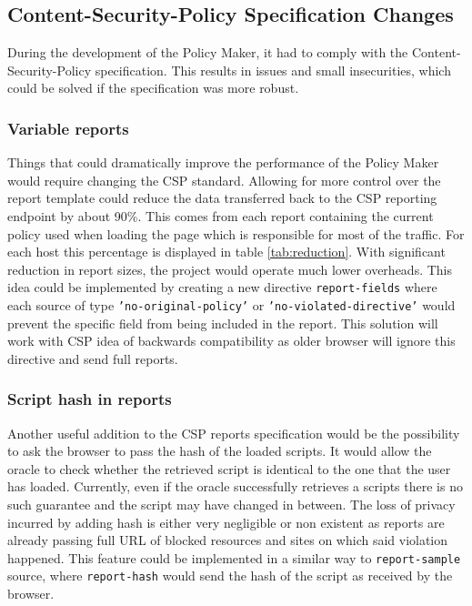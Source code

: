 \subsection{Content-Security-Policy Specification Changes}

During the development of the Policy Maker, it had to comply with the Content-Security-Policy specification.
This results in issues and small insecurities, which could be solved if the specification was more robust.

\subsubsection{Variable reports}

Things that could dramatically improve the performance of the Policy Maker would require changing the CSP standard.
Allowing for more control over the report template could reduce the data transferred back to the CSP reporting endpoint by about 90\%.
This comes from each report containing the current policy used when loading the page which is responsible for most of the traffic.
For each host this percentage is displayed in table \ref{tab:reduction}.
With significant reduction in report sizes, the project would operate much lower overheads.
This idea could be implemented by creating a new directive \texttt{report-fields} where each source of type \texttt{'no-original-policy'} or \texttt{'no-violated-directive'} would prevent the specific field from being included in the report.
This solution will work with CSP idea of backwards compatibility as older browser will ignore this directive and send full reports.



\subsubsection{Script hash in reports}

Another useful addition to the CSP reports specification would be the possibility to ask the browser to pass the hash of the loaded scripts.
It would allow the oracle to check whether the retrieved script is identical to the one that the user has loaded.
Currently, even if the oracle successfully retrieves a scripts there is no such guarantee and the script may have changed in between.
The loss of privacy incurred by adding hash is either very negligible or non existent as reports are already passing full URL of blocked resources and sites on which said violation happened.
This feature could be implemented in a similar way to \texttt{report-sample} source, where \texttt{report-hash} would send the hash of the script as received by the browser.

